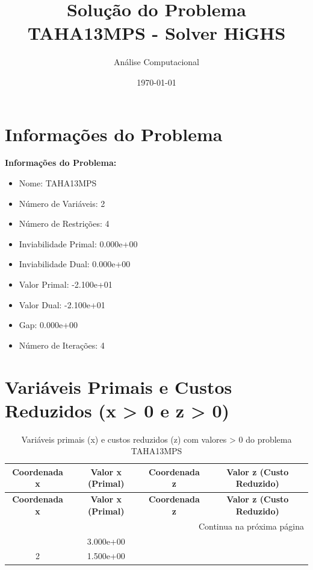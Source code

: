 \documentclass[12pt]{article}
\title{Solução do Problema TAHA13MPS - Solver HiGHS}
\author{Análise Computacional}
\date{\today}
\begin{document}
\maketitle

\section{Informações do Problema}

\textbf{Informações do Problema:}
\begin{itemize}
\item Nome: TAHA13MPS
\item Número de Variáveis: 2
\item Número de Restrições: 4
\item Inviabilidade Primal: 0.000e+00
\item Inviabilidade Dual: 0.000e+00
\item Valor Primal: -2.100e+01
\item Valor Dual: -2.100e+01
\item Gap: 0.000e+00
\item Número de Iterações: 4
\end{itemize}


\section{Variáveis Primais e Custos Reduzidos (x > 0 e z > 0)}

\begin{longtable}{@{}cccc@{}}
\caption{Variáveis primais (x) e custos reduzidos (z) com valores > 0 do problema TAHA13MPS} \\
\toprule
\textbf{Coordenada x} & \textbf{Valor x (Primal)} & \textbf{Coordenada z} & \textbf{Valor z (Custo Reduzido)} \\
\midrule
\endfirsthead

\toprule
\textbf{Coordenada x} & \textbf{Valor x (Primal)} & \textbf{Coordenada z} & \textbf{Valor z (Custo Reduzido)} \\
\midrule
\endhead

\midrule \multicolumn{4}{r}{{Continua na próxima página}} \\ \midrule
\endfoot

\bottomrule
\endlastfoot
1 & 3.000e+00 &  &  \\
2 & 1.500e+00 &  &  \\

\bottomrule
\end{longtable}
\end{document}
